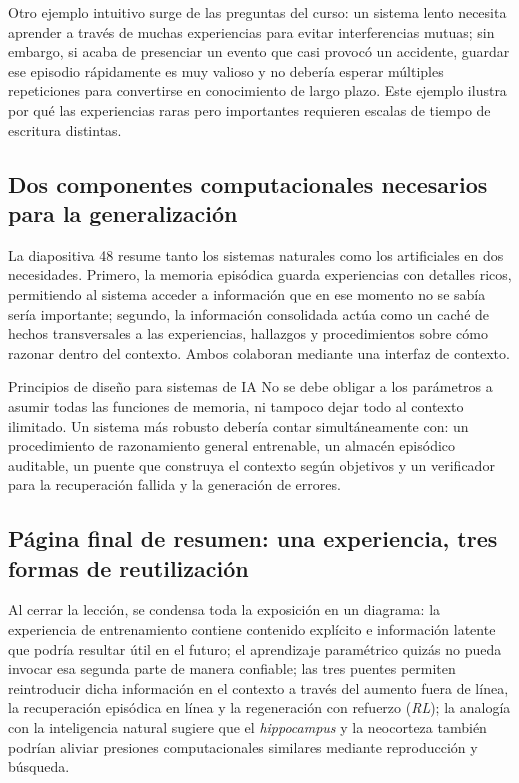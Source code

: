 Otro ejemplo intuitivo surge de las preguntas del curso: un sistema lento necesita aprender a través de muchas experiencias para evitar interferencias mutuas; sin embargo, si acaba de presenciar un evento que casi provocó un accidente, guardar ese episodio rápidamente es muy valioso y no debería esperar múltiples repeticiones para convertirse en conocimiento de largo plazo. Este ejemplo ilustra por qué las experiencias raras pero importantes requieren escalas de tiempo de escritura distintas.

\subsection{Dos componentes computacionales necesarios para la generalización}

La diapositiva 48 resume tanto los sistemas naturales como los artificiales en dos necesidades. Primero, la memoria episódica guarda experiencias con detalles ricos, permitiendo al sistema acceder a información que en ese momento no se sabía sería importante; segundo, la información consolidada actúa como un caché de hechos transversales a las experiencias, hallazgos y procedimientos sobre cómo razonar dentro del contexto. Ambos colaboran mediante una interfaz de contexto.


\begin{importantbox}{Principios de diseño para sistemas de IA}
No se debe obligar a los parámetros a asumir todas las funciones de memoria, ni tampoco dejar todo al contexto ilimitado. Un sistema más robusto debería contar simultáneamente con: un procedimiento de razonamiento general entrenable, un almacén episódico auditable, un puente que construya el contexto según objetivos y un verificador para la recuperación fallida y la generación de errores.
\end{importantbox}

\subsection{Página final de resumen: una experiencia, tres formas de reutilización}

Al cerrar la lección, se condensa toda la exposición en un diagrama: la experiencia de entrenamiento contiene contenido explícito e información latente que podría resultar útil en el futuro; el aprendizaje paramétrico quizás no pueda invocar esa segunda parte de manera confiable; las tres puentes permiten reintroducir dicha información en el contexto a través del aumento fuera de línea, la recuperación episódica en línea y la regeneración con refuerzo (\textit{RL}); la analogía con la inteligencia natural sugiere que el \textit{hippocampus} y la neocorteza también podrían aliviar presiones computacionales similares mediante reproducción y búsqueda.

